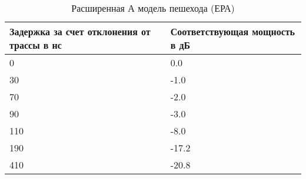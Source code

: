 

\begin{table} [htb]
  \centering
\parbox{15cm}{\caption{Расширенная А модель пешехода (ЕРА) \cite{TS36104}}\label{EPA}}
\begin{tabular}{|p{7cm}|p{7cm}|}
    \hline
    \hline
    Задержка за счет отклонения от трассы в нс &  Соответствующая мощность в дБ \\ \hline \hline
    0                                     & 0.0                           \\ \hline
    30                                    & -1.0                          \\ \hline
    70                                    & -2.0                          \\ \hline
    90                                    & -3.0                          \\ \hline
    110                                   & -8.0                          \\ \hline
    190                                   & -17.2                         \\ \hline
    410                                   & -20.8                         \\ \hline
    \end{tabular}

\end{table}

